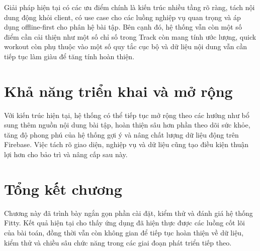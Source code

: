 Giải pháp hiện tại có các ưu điểm chính là kiến trúc nhiều tầng rõ ràng, tách nội dung động khỏi client, có use case cho các luồng nghiệp vụ quan trọng và áp dụng offline-first cho phân hệ bài tập. Bên cạnh đó, hệ thống vẫn còn một số điểm cần cải thiện như một số chỉ số trong Track còn mang tính ước lượng, quick workout còn phụ thuộc vào một số quy tắc cục bộ và dữ liệu nội dung vẫn cần tiếp tục làm giàu để tăng tính hoàn thiện.

\section{Khả năng triển khai và mở rộng}

Với kiến trúc hiện tại, hệ thống có thể tiếp tục mở rộng theo các hướng như bổ sung thêm nguồn nội dung bài tập, hoàn thiện sâu hơn phần theo dõi sức khỏe, tăng độ phong phú của hệ thống gợi ý và nâng chất lượng dữ liệu động trên Firebase. Việc tách rõ giao diện, nghiệp vụ và dữ liệu cũng tạo điều kiện thuận lợi hơn cho bảo trì và nâng cấp sau này.

\section{Tổng kết chương}

Chương này đã trình bày ngắn gọn phần cài đặt, kiểm thử và đánh giá hệ thống Fitty. Kết quả hiện tại cho thấy ứng dụng đã hiện thực được các luồng cốt lõi của bài toán, đồng thời vẫn còn không gian để tiếp tục hoàn thiện về dữ liệu, kiểm thử và chiều sâu chức năng trong các giai đoạn phát triển tiếp theo.
